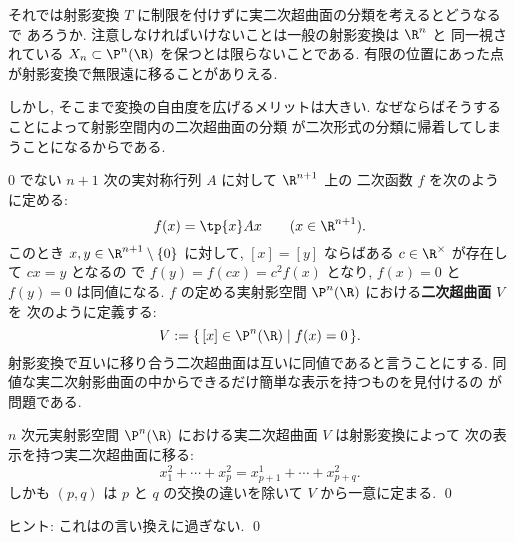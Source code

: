 \documentclass[12pt,twoside]{jarticle}
\begin{document}
それでは射影変換 $T$ に制限を付けずに実二次超曲面の分類を考えるとどうなるで
あろうか.  注意しなければいけないことは一般の射影変換は $\R^n$ と
同一視されている $X_n\subset\P^n(\R)$ を保つとは限らないことである.
有限の位置にあった点が射影変換で無限遠に移ることがありえる.

しかし, そこまで変換の自由度を広げるメリットは大きい.
なぜならばそうすることによって射影空間内の二次超曲面の分類
が二次形式の分類に帰着してしまうことになるからである.

\medskip

$0$ でない $n+1$ 次の実対称行列 $A$ に対して $\R^{n+1}$ 上の
二次函数 $f$ を次のように定める:
\begin{equation*}
  f(x) = \tp{x}Ax
  \qquad (x\in\R^{n+1}).
\end{equation*}
このとき $x,y\in\R^{n+1}\setminus\{0\}$ に対して, 
$[x]=[y]$ ならばある $c\in\R^\times$ が存在して $cx=y$ となるの
で $f(y)=f(cx)=c^2f(x)$ となり, $f(x)=0$ と $f(y)=0$ は同値になる.
$f$ の定める実射影空間 $\P^n(\R)$ における{\bf 二次超曲面} $V$ を
次のように定義する:
\begin{equation*}
  V := \{\,[x]\in\P^n(\R)\mid f(x)=0 \,\}.
\end{equation*}
射影変換で互いに移り合う二次超曲面は互いに同値であると言うことにする.
同値な実二次射影曲面の中からできるだけ簡単な表示を持つものを見付けるの
が問題である.

\begin{question}[実射影空間における実二次超曲面の分類]
  $n$ 次元実射影空間 $\P^n(\R)$ における実二次超曲面 $V$ は射影変換によって
  次の表示を持つ実二次超曲面に移る:
  \begin{equation*}
    x_1^2 + \cdots + x_p^2 = x_{p+1}^1+\cdots+x_{p+q}^2.
  \end{equation*}
  しかも $(p,q)$ は $p$ と $q$ の交換の違いを除いて $V$ から一意に定まる.
  \qed
\end{question}

\noindent
ヒント: これはの言い換えに過ぎない.
\qed

\end{document}
